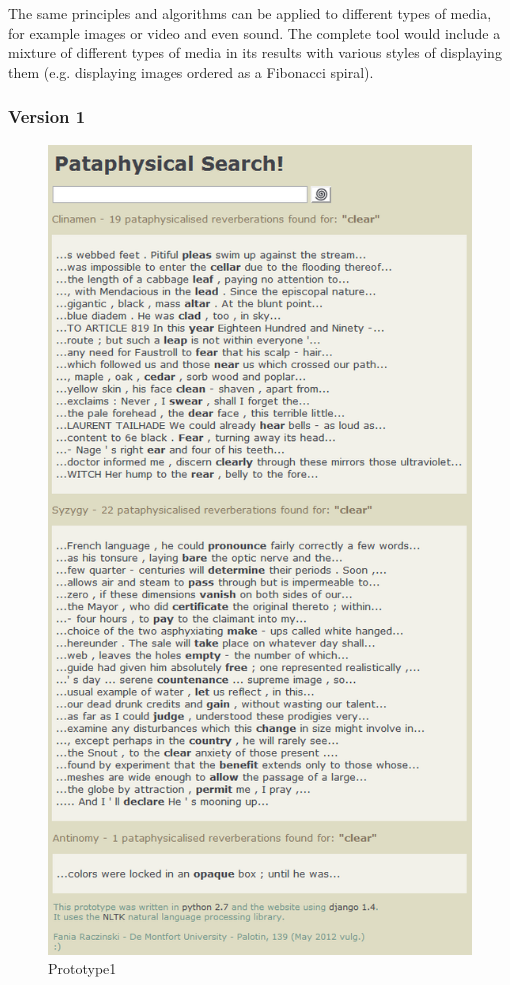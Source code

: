 The same principles and algorithms can be applied to different types of media, for example images or video and even sound. The complete tool would include a mixture of different types of media in its results with various styles of displaying them (e.g. displaying images ordered as a Fibonacci spiral).

\subsubsection{Version 1}

\begin{figure}[!htb] %
\centering
\includegraphics[height=0.6\textheight]{images/clear.png}
\caption[Prototype1]{Prototype1}
\label{fig:Prototype1}
\end{figure}

